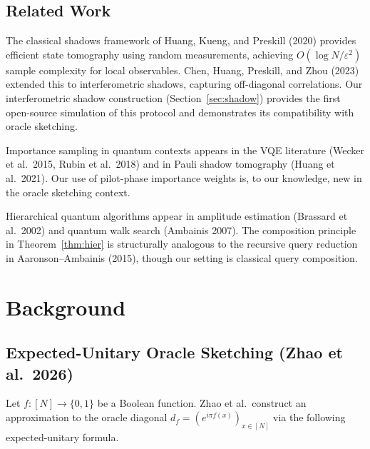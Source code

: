 \documentclass[11pt]{article}
\newcommand{\eps}{\varepsilon}
\begin{document}
\subsection{Related Work}

The classical shadows framework of Huang, Kueng, and Preskill (2020) provides efficient state tomography using random measurements, achieving $O(\log N / \eps^2)$ sample complexity for local observables.  Chen, Huang, Preskill, and Zhou (2023) extended this to interferometric shadows, capturing off-diagonal correlations.  Our interferometric shadow construction (Section~\ref{sec:shadow}) provides the first open-source simulation of this protocol and demonstrates its compatibility with oracle sketching.

Importance sampling in quantum contexts appears in the VQE literature (Wecker et al.\ 2015, Rubin et al.\ 2018) and in Pauli shadow tomography (Huang et al.\ 2021).  Our use of pilot-phase importance weights is, to our knowledge, new in the oracle sketching context.

Hierarchical quantum algorithms appear in amplitude estimation (Brassard et al.\ 2002) and quantum walk search (Ambainis 2007).  The composition principle in Theorem~\ref{thm:hier} is structurally analogous to the recursive query reduction in Aaronson--Ambainis (2015), though our setting is classical query composition.

\section{Background}\label{sec:background}

\subsection{Expected-Unitary Oracle Sketching (Zhao et al.\ 2026)}

Let $f: [N] \to \{0,1\}$ be a Boolean function.  Zhao et al.\ construct an approximation to the oracle diagonal $d_f = (e^{i\pi f(x)})_{x\in[N]}$ via the following expected-unitary formula.
\end{document}
